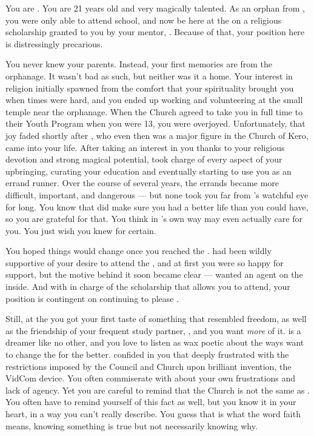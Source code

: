 \documentclass[char]{GL2020}
\begin{document}
\name{\cScholarship{}}

You are \cScholarship{\intro}. You are 21 years old and very magically talented. As an orphan from \pTech{}, you were only able to attend school, and now be here at the \pSchool{} on a religious scholarship granted to you by your mentor, \cAntiChup{\full}. Because of that, your position here is distressingly precarious.

You never knew your parents. Instead, your first memories are from the orphanage. It wasn't bad as such, but neither was it a home. Your interest in religion initially spawned from the comfort that your spirituality brought you when times were hard, and you ended up working and volunteering at the small temple near the orphanage. When the Church agreed to take you in full time to their Youth Program when you were 13, you were overjoyed. Unfortunately, that joy faded shortly after \cAntiChup{}, who even then was a major figure in the Church of Kero, came into your life. After taking an interest in you thanks to your religious devotion and strong magical potential, \cAntiChup{} took charge of every aspect of your upbringing, curating your education and eventually starting to use you as an errand runner. Over the course of several years, the errands became more difficult, important, and dangerous — but none took you far from \cAntiChup{}'s watchful eye for long. You know that \cAntiChup{} did make sure you had a better life than you could have, so you are grateful for that. You think in \cAntiChup{}’s own way \cAntiChup{} may even actually care for you. You just wish you knew for certain.

You hoped things would change once you reached the \pSchool{}. \cAntiChup{} had been wildly supportive of your desire to attend the \pSc{}, and at first you were so happy for \cAntiChup{\their} support, but the motive behind it soon became clear — \cAntiChup{\they} wanted an agent on the inside. And with \cAntiChup{} in charge of the scholarship that allows you to attend, your position is contingent on continuing to please \cAntiChup{\them}. 

Still, at the \pSchool{} you got your first taste of something that resembled freedom, as well as the friendship of your frequent study partner, \cTechStar{\full}, and you want \emph{more} of it. \cTechStar{} is a dreamer like no other, and you love to listen as \cTechStar{\they} wax\cTechStar{\verbes} poetic about the ways \cTechStar{\they} want\cTechStar{\verbs} to change the \pTech{} for the better. \cTechStar{\Theyhave} confided in you that \cTechStar{\theyare} deeply frustrated with the restrictions imposed by the Council and Church upon \cTechStar{\their} brilliant invention, the VidCom device. You often commiserate with \cTechStar{\them} about your own frustrations and lack of agency. Yet you are careful to remind \cTechStar{} that the Church is not the same as \cTechGod{}. You often have to remind yourself of this fact as well, but you know it in your heart, in a way you can’t really describe. You guess that is what the word faith means, knowing something is true but not necessarily knowing why.
\end{document}
